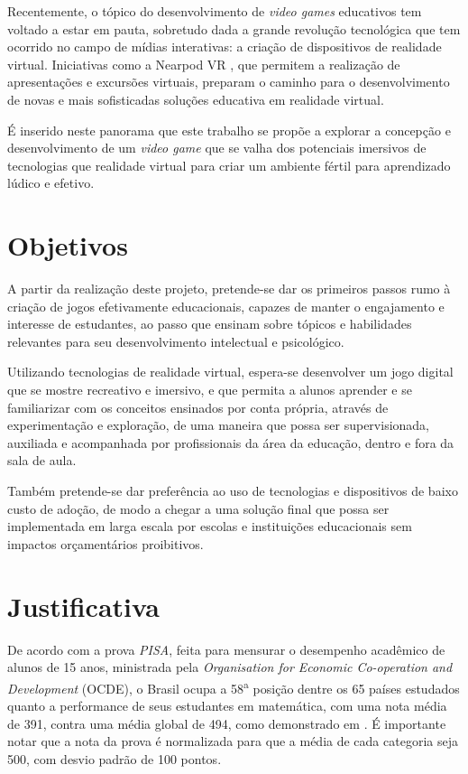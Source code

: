 Recentemente, o tópico do desenvolvimento de 
\textit{video games} educativos tem voltado a estar em 
pauta, sobretudo dada a grande revolução tecnológica 
que tem ocorrido no campo de mídias interativas: a 
criação de dispositivos de realidade virtual. 
Iniciativas como a Nearpod VR \cite{nearpod}, que 
permitem a realização de apresentações e excursões 
virtuais, preparam o caminho para o desenvolvimento 
de novas e mais sofisticadas soluções educativa em 
realidade virtual.

É inserido neste panorama que este trabalho se propõe a 
explorar a concepção e desenvolvimento de um \textit{video game} 
que se valha dos potenciais imersivos de tecnologias que 
realidade virtual para criar um ambiente fértil para 
aprendizado lúdico e efetivo.

\section{Objetivos}\label{sec-objetivos}

A partir da realização deste projeto, pretende-se dar os 
primeiros passos rumo à criação de jogos efetivamente 
educacionais, capazes de manter o engajamento e interesse 
de estudantes, ao passo que ensinam sobre tópicos e 
habilidades relevantes para seu desenvolvimento intelectual 
e psicológico.

Utilizando tecnologias de realidade virtual, espera-se 
desenvolver um jogo digital que se mostre recreativo e 
imersivo, e que permita a alunos aprender e se familiarizar 
com os conceitos ensinados por conta própria, através de 
experimentação e exploração, de uma maneira que possa ser 
supervisionada, auxiliada e acompanhada por profissionais 
da área da educação, dentro e fora da sala de aula.

Também pretende-se dar preferência ao uso de tecnologias 
e dispositivos de baixo custo de adoção, de modo a chegar 
a uma solução final  que possa ser implementada em larga 
escala por escolas e instituições educacionais sem impactos 
orçamentários proibitivos.

\section{Justificativa}\label{sec-justificativas}

De acordo com a prova \textit{PISA}, feita para mensurar o 
desempenho acadêmico de alunos de 15 anos, ministrada pela 
\textit{Organisation for Economic Co-operation and Development} 
(OCDE), o Brasil ocupa a 58\textsuperscript{a} posição dentre 
os 65 países estudados quanto a performance de seus estudantes 
em matemática, com uma nota média de 391, contra uma média 
global de 494, como demonstrado em \cite{OECD:2012:pisa-brazil}. 
É importante notar que a nota da prova é normalizada para 
que a média de cada categoria seja 500, com desvio padrão 
de 100 pontos. 

